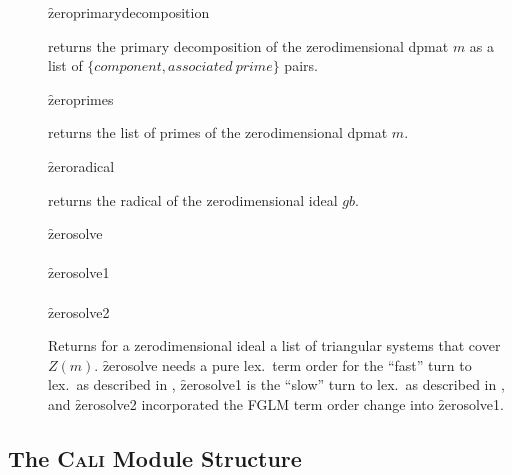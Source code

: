 \begin{description}
\item[]
  \begin{syntax}
    \f{zeroprimarydecomposition} 
  \end{syntax}
  \hypertarget{operator:ZEROPRIMARYDECOMPOSITION}{}
returns the primary decomposition of the zerodimensional dpmat
$m$ as a list of $\{component, associated\ prime\}$ pairs.

\item[]
  \begin{syntax}
    \f{zeroprimes} 
  \end{syntax}
  \hypertarget{operator:ZEROPRIMES}{}
returns the list of primes of the zerodimensional dpmat $m$.

\item[]
  \begin{syntax}
    \f{zeroradical} 
  \end{syntax}
  \hypertarget{operator:ZERORADICAL}{}
returns the radical of the zerodimensional ideal $gb$.

\item[]
  \begin{syntaxtable}
    \f{zerosolve}  \\
     \\
    \f{zerosolve1}  \\
     \\
    \f{zerosolve2} 
  \end{syntaxtable}
  \hypertarget{operator:ZEROSOLVE}{}
  \hypertarget{operator:ZEROSOLVE1}{}
  \hypertarget{operator:ZEROSOLVE2}{}
Returns for a zerodimensional ideal a list of triangular systems
that cover $Z(m)$. \f{zerosolve} needs a pure lex.\ term order for
the ``fast'' turn to lex.\ as described in \cite{Moeller:93}, \f{zerosolve1}
is the ``slow'' turn to lex.\ as described in \cite{Graebe:95b},
and \f{zerosolve2} incorporated the FGLM term order change into \f{zerosolve1}.
\end{description}
\pagebreak


\subsection{The \textsc{Cali} Module Structure}
\vfill


